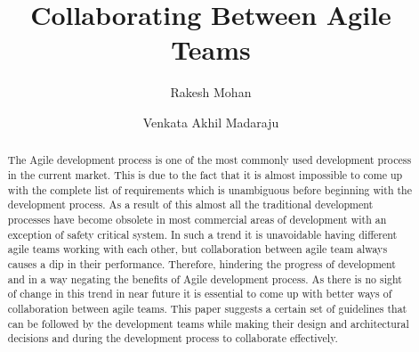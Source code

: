 \documentclass[sigconf]{acmart}
\begin{document}
%
\title{Collaborating Between Agile Teams}

%
\author{Rakesh Mohan}
\author{Venkata Akhil Madaraju}

%
\begin{abstract}
The Agile development process is one of the most commonly used development process in the current market. This is due to the fact that it is almost impossible to come up with the complete list of requirements which is unambiguous before beginning with the development process. As a result of this almost all the traditional development processes have become obsolete in most commercial areas of development with an exception of safety critical system. In such a trend it is unavoidable having different agile teams working with each other, but collaboration between agile team always causes a dip in their performance. Therefore, hindering the progress of development and in a way negating the benefits of Agile development process. As there is no sight of change in this trend in near future it is essential to come up with better ways of collaboration between agile teams. This paper suggests a certain set of guidelines that can be followed by the development teams while making their design and architectural decisions and during the development process to collaborate effectively.
\end{abstract}


%

%


%
\maketitle
\end{document}
